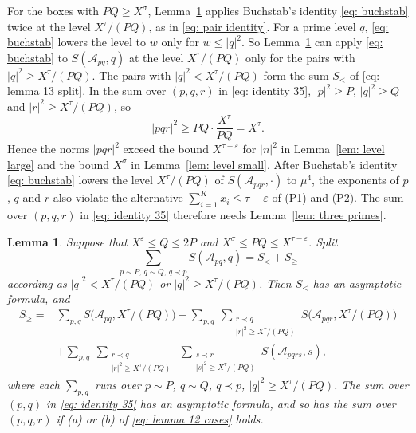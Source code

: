 \documentclass{article}
\numberwithin{equation}{section}
\newtheorem{lemma}{Lemma}
\newcommand{\Le}{\leqslant}
\newcommand{\Ge}{\geqslant}
\begin{document}
For the boxes with $PQ \Ge X^{\sigma}$, Lemma~\ref{lem: lemma 13} applies Buchstab's identity \eqref{eq: buchstab} twice at the level $X^{\tau}/(PQ)$, as in \eqref{eq: pair identity}. For a prime level $q$, \eqref{eq: buchstab} lowers the level to $w$ only for $w \Le |q|^2$. So Lemma~\ref{lem: lemma 13} can apply \eqref{eq: buchstab} to $S(\mathcal{A}_{pq}, q)$ at the level $X^{\tau}/(PQ)$ only for the pairs with $|q|^2 \Ge X^{\tau}/(PQ)$. The pairs with $|q|^2 < X^{\tau}/(PQ)$ form the sum $S_<$ of \eqref{eq: lemma 13 split}. In the sum over $(p, q, r)$ in \eqref{eq: identity 35}, $|p|^2 \Ge P$, $|q|^2 \Ge Q$ and $|r|^2 \Ge X^{\tau}/(PQ)$, so
\begin{equation*}
|pqr|^2 \Ge PQ \cdot \frac{X^{\tau}}{PQ} = X^{\tau}.
\end{equation*}
Hence the norms $|pqr|^2$ exceed the bound $X^{\tau - \varepsilon}$ for $|n|^2$ in Lemma~\ref{lem: level large} and the bound $X^{\sigma}$ in Lemma~\ref{lem: level small}. After Buchstab's identity \eqref{eq: buchstab} lowers the level $X^{\tau}/(PQ)$ of $S(\mathcal{A}_{pqr}, \cdot)$ to $\mu^4$, the exponents of $p$, $q$ and $r$ also violate the alternative $\sum_{i=1}^{K} x_i \Le \tau - \varepsilon$ of (P1) and (P2). The sum over $(p, q, r)$ in \eqref{eq: identity 35} therefore needs Lemma~\ref{lem: three primes}.

\begin{lemma}
\label{lem: lemma 13}
Suppose that $X^{\varepsilon} \Le Q \Le 2P$ and $X^{\sigma} \Le PQ \Le X^{\tau - \varepsilon}$. Split
\begin{equation}
\label{eq: lemma 13 split}
\sum_{p \sim P,\, q \sim Q,\, q \prec p} S(\mathcal{A}_{pq}, q) = S_< + S_\Ge
\end{equation}
according as $|q|^2 < X^{\tau}/(PQ)$ or $|q|^2 \Ge X^{\tau}/(PQ)$. Then $S_<$ has an asymptotic formula, and
\begin{equation}
\label{eq: identity 35}
\begin{aligned}
S_\Ge = {} & \sum_{p, q} S\bigl(\mathcal{A}_{pq}, X^{\tau}/(PQ)\bigr) - \sum_{p, q}\ \sum_{\substack{r \prec q \\ |r|^2 \Ge X^{\tau}/(PQ)}} S\bigl(\mathcal{A}_{pqr}, X^{\tau}/(PQ)\bigr) \\
& + \sum_{p, q}\ \sum_{\substack{r \prec q \\ |r|^2 \Ge X^{\tau}/(PQ)}}\ \sum_{\substack{s \prec r \\ |s|^2 \Ge X^{\tau}/(PQ)}} S(\mathcal{A}_{pqrs}, s),
\end{aligned}
\end{equation}
where each $\sum_{p, q}$ runs over $p \sim P$, $q \sim Q$, $q \prec p$, $|q|^2 \Ge X^{\tau}/(PQ)$. The sum over $(p, q)$ in \eqref{eq: identity 35} has an asymptotic formula, and so has the sum over $(p, q, r)$ if (a) or (b) of \eqref{eq: lemma 12 cases} holds.
\end{lemma}
\end{document}
